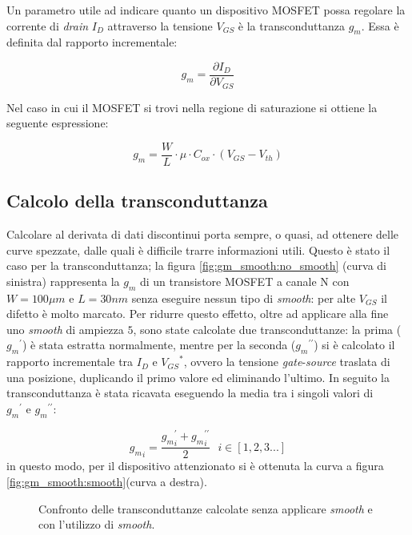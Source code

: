 Un parametro utile ad indicare quanto un dispositivo MOSFET possa regolare la corrente di \emph{drain} $I_D$ attraverso la tensione $V_{GS}$ è la transconduttanza $g_m$. Essa è definita dal rapporto incrementale:

\begin{equation}
    g_m = \frac{\partial I_D}{\partial V_{GS}}
\end{equation}

Nel caso in cui il MOSFET si trovi nella regione di saturazione si ottiene la seguente espressione:

\begin{equation}
    g_m = \frac{W}{L} \cdot \mu \cdot C_{ox} \cdot (V_{GS} - V_{th})
    \label{eq:gm}
\end{equation}


\subsection{Calcolo della transconduttanza}
Calcolare al derivata di dati discontinui porta sempre, o quasi, ad ottenere delle curve spezzate, dalle quali è difficile trarre informazioni utili.
Questo è stato il caso per la transconduttanza; la figura \ref{fig:gm_smooth:no_smooth} (curva di sinistra) rappresenta la $g_m$ di un transistore  MOSFET a canale N con $ W = 100\mu m$ e $L = 30 nm$ senza eseguire nessun tipo di \emph{smooth}: per alte $V_{GS}$ il difetto è molto marcato. Per ridurre questo effetto, oltre ad applicare alla fine uno \emph{smooth} di ampiezza $5$, sono state calcolate due transconduttanze: la prima (${g_m}^{\prime}$) è stata estratta normalmente, mentre per la seconda (${g_m}^{\prime \prime}$) si è calcolato il rapporto incrementale tra $I_D$ e ${V_{GS}}^*$, ovvero la tensione \emph{gate}-\emph{source} traslata di una posizione, duplicando il primo valore ed eliminando l'ultimo. In seguito la transconduttanza è stata ricavata eseguendo la media tra i singoli valori di ${g_m}^\prime \text{ e } {g_m}^{\prime \prime}$:

\begin{equation}
    {g_m}_i = \frac{{g_m}_i^{\prime} + {g_m}_i^{\prime \prime}}{2} \text{ } i \in [1 , 2 , 3 . . .]
\end{equation}
in questo modo, per il dispositivo attenzionato si è ottenuta la curva a figura \ref{fig:gm_smooth:smooth}(curva a destra).

\begin{figure}[h]
    \centering

    \caption[Confronto $g_m$ senza utilizzo di \emph{smooth} e con utilizzo di \emph{smooth}]{Confronto delle transconduttanze calcolate senza applicare \emph{smooth} e con l'utilizzo di \emph{smooth}.}
    \label{fig:gm_smooth}
\end{figure}


